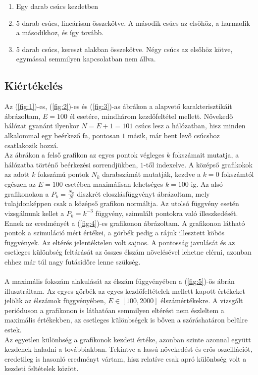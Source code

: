 \begin{enumerate}
    \item Egy darab csúcs kezdetben
    \item 5 darab csúcs, lineárisan összekötve. A második csúcs az elsőhöz, a harmadik a másodikhoz, és így tovább.
    \item 5 darab csúcs, kereszt alakban összekötve. Négy csúcs az elsőhöz kötve, egymással semmilyen kapcsolatban nem állva.
\end{enumerate}

\subsection{Kiértékelés} \label{sub:2.2}
Az (\ref{fig:1})-es, (\ref{fig:2})-es és (\ref{fig:3})-as ábrákon a \pmd alapvető karakterisztikáit ábrázoltam, $E=100$ él esetére, mindhárom kezdőfeltétel mellett. Nővekedő hálózat gyanánt ilyenkor $N = E+1 = 101$ csúcs lesz a hálózatban, hisz minden alkalommal egy beérkező fa, pontosan $1$ másik, már bent levő csúcshoz csatlakozik hozzá. \\
Az ábrákon a felső grafikon az egyes pontok végleges $k$ fokszámait mutatja, a hálózatba történő beérkezési sorrendjükben, $1$-től indexelve. A középső grafikokok az adott $k$ fokszámú pontok $N_{k}$ darabszámát mutatják, kezdve a $k=0$ fokszámtól egészen az $E=100$ esetében maximálisan lehetséges $k=100$-ig. Az alsó grafikonokon a $P_k = \frac{N_{k}}{N}$ diszkrét eloszlásfüggvényt ábrázoltam, mely tulajdonképpen csak a középső grafikon normáltja. Az utolsó függvény esetén vizsgálnunk kellet a $P_{k} = k^{-3}$ függvény, szimulált pontokra való illeszkedését. Ennek az eredményét a (\ref{fig:4})-es grafikonon ábrázoltam. A grafikonon látható pontok a szimuláció mért értékei, a görbék pedig a rájuk illesztett köbös függvények. Az eltérés jelentéktelen volt sajnos. A pontosság javulását és az esetleges különbség feltárását az összes élszám növelésével lehetne elérni, azonban ehhez már túl nagy futásidőre lenne szükség.
\\ \\
A maximális fokszám alakulását az élszám függvényében a (\ref{fig:5})-ös ábrán illusztráltam. Az egyes görbék az egyes kezdőfeltételek mellett kapott értékeket jelölik az élszámok függvényében, $E \in \left[ 100, 2000 \right]$ élszámértékekre. A vizsgált perióduson a grafikonon is láthatóan semmilyen eltérést nem észleltem a maximális értékekben, az esetleges különbségek is bőven a szóráshatáron belülre estek. \\
Az egyetlen különbség a grafikonok kezdeti értéke, azonban szinte azonnal együtt kezdenek haladni a továbbiakban. Tekintve a lassú növekedést és erős oszcillációt, eredetileg is hasonló eredményt vártam, hisz relatíve csak apró különbség volt a kezdeti feltételek között.

